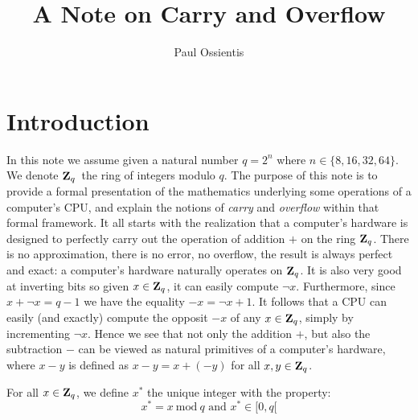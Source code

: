 \documentclass{article}
\title{A Note on Carry and Overflow}
\author{Paul Ossientis}
\newcommand{\zq}{\mbox{${\bf Z}_{q}$}}
\begin{document}
\maketitle

\section{Introduction}
In this note we assume given a natural number $q=2^{n}$ where 
$n\in\{8,16,32,64\}$. We denote \zq\ the ring of integers modulo $q$. 
The purpose of this note is to provide a formal presentation of the mathematics
underlying some operations of a computer's CPU, and explain the notions of {\em
carry} and {\em overflow} within that formal framework. It all starts with the
realization that a computer's hardware is designed to perfectly carry out the
operation of addition $+$ on the ring \zq. There is no approximation,
there is no error, no overflow, the result is always perfect and exact: a 
computer's hardware naturally operates on \zq. It is also very good at 
inverting bits so given $x\in\zq$, it can easily compute $\lnot x$.
Furthermore, since $x+\lnot x = q-1$ we have the equality $-x = \lnot x + 1$.
It follows that a CPU can easily (and exactly) compute the opposit $-x$ of 
any $x\in\zq$, simply by incrementing $\lnot x$. Hence we see that not only 
the addition $+$, but also the subtraction $-$ can be viewed as natural 
primitives of a computer's hardware, where $x - y$ is defined as 
$x-y = x + (-y)$ for all $x,y\in\zq$.

\begin{defin}\label{carry:star} 
  For all $x\in\zq$, we define $x^{*}$ the unique integer with the property:
    \[
      x^{*} = x\ \mbox{mod}\ q\mbox{\ \ and\ \ }x^{*}\in[0,q[
    \]
\end{defin}
\end{document}
